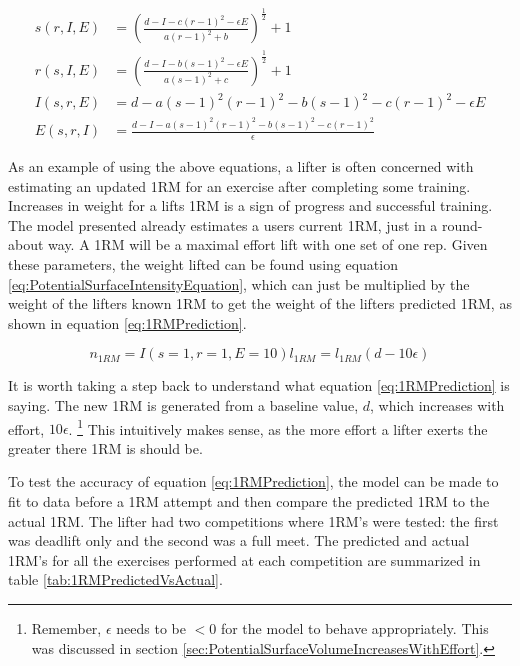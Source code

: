 \begin{subequations}
    \begin{align}
        s(r,I,E)&=
        \left( 
            \frac{
                d-I-c(r-1)^2-\epsilon E
            }{
                a(r-1)^2+b
            }
        \right)^\frac{1}{2}+1
        \label{eq:PotentialSurfaceSetsEquation}\\
        r(s,I,E)&=
        \left(
            \frac{
                d-I-b(s-1)^2-\epsilon E
            }{
                a(s-1)^2+c
            }
        \right)^\frac{1}{2}+1
        \label{eq:PotentialSurfaceRepsEquation}\\
        I(s,r,E)&=
        d-a(s-1)^2(r-1)^2-b(s-1)^2-c(r-1)^2-\epsilon E
        \label{eq:PotentialSurfaceIntensityEquation}\\
        E(s,r,I)&=
        \frac{
            d-I-a(s-1)^2(r-1)^2-b(s-1)^2-c(r-1)^2
        }{
            \epsilon
        }
        \label{eq:PotentialSurfaceEffortEquation}
    \end{align}
\end{subequations}

As an example of using the above equations, a lifter is often concerned with estimating an updated 1RM for an exercise after completing some training. Increases in weight for a lifts 1RM is a sign of progress and successful training. The model presented already estimates a users current 1RM, just in a round-about way. A 1RM will be a maximal effort lift with one set of one rep. Given these parameters, the weight lifted can be found using equation \ref{eq:PotentialSurfaceIntensityEquation}, which can just be multiplied by the weight of the lifters known 1RM to get the weight of the lifters predicted 1RM, as shown in equation \ref{eq:1RMPrediction}.

\begin{equation}
    \label{eq:1RMPrediction}
    n_{1RM}=I(s=1,r=1,E=10)l_{1RM}=l_{1RM}( d-10\epsilon )
\end{equation}

It is worth taking a step back to understand what equation \ref{eq:1RMPrediction} is saying. The new 1RM is generated from a baseline value, $d$, which increases with effort, $10\epsilon$. \footnote{Remember, $\epsilon$ needs to be $<0$ for the model to behave appropriately. This was discussed in section \ref{sec:PotentialSurfaceVolumeIncreasesWithEffort}.} This intuitively makes sense, as the more effort a lifter exerts the greater there 1RM is should be.

To test the accuracy of equation \ref{eq:1RMPrediction}, the model can be made to fit to data before a 1RM attempt and then compare the predicted 1RM to the actual 1RM. The lifter had two competitions where 1RM's were tested: the first was deadlift only and the second was a full meet. The predicted and actual 1RM's for all the exercises performed at each competition are summarized in table \ref{tab:1RMPredictedVsActual}.

